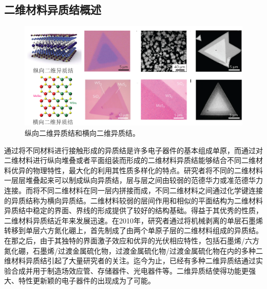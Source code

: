 \subsection{二维材料异质结概述}

    \begin{figure}[htb]
        \includegraphics{pic/INTRO_heterostructure_VertAndLate.png}
        \caption{纵向二维异质结和横向二维异质结。}
    \end{figure}

    通过将不同材料进行接触形成的异质结是许多电子器件的基本组成单原，而通过对二维材料进行纵向堆叠或者平面组装而形成的二维材料异质结能够结合不同二维材料优异的物理特性，最大化的利用其性质多样化的特点。研究者将不同的二维材料一层层堆叠起来可以制成纵向异质结，层与层之间由较弱的范德华力或准范德华力连接。而将不同二维材料在同一层内拼接而成，不同二维材料之间通过化学键连接的异质结称为横向异质结。二维材料较弱的层间作用和相似的平面结构为二维材料异质结中稳定的界面、界线的形成提供了较好的结构基础。得益于其优秀的性质，二维材料异质结近年来发展迅速。在2010年，研究者通过将机械剥离的单层石墨烯转移到单层六方氮化硼上，首先制成了由两个单原子层的二维材料组成的异质结。在那之后，由于其独特的界面激子效应和优异的光伏相应特性，包括石墨烯/六方氮化硼，石墨烯/过渡金属硫化物，过渡金属硫化物/过渡金属硫化物在内的多种二维材料异质结引起了大量研究者的关注。迄今为止，已经有多种二维异质结通过实验合成并用于制造场效应管、存储器件、光电器件等。二维异质结使得功能更强大、特性更新颖的电子器件的出现成为了可能。

